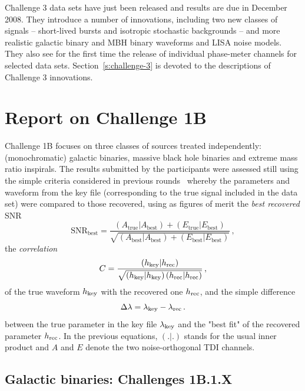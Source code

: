 \documentclass{iopart}
\begin{document}
Challenge 3 data sets have just been released and results are due in December 2008. They introduce a number of innovations, including two new classes of signals -- short-lived bursts and isotropic stochastic backgrounds -- and more realistic galactic binary and MBH binary waveforms and LISA noise models. They also see for the first time the release of individual phase-meter channels for selected data sets. Section~\ref{s:challenge-3} is devoted to the descriptions of Challenge 3 innovations.


\section{Report on Challenge 1B}
\label{s:challenge-1b}

Challenge 1B focuses on three classes of sources treated independently: (monochromatic) galactic binaries, massive black hole binaries and extreme mass ratio inspirals. The results submitted by the participants were assessed still using the simple criteria considered in previous rounds~\cite{mldcgwdaw1, mldcamaldi2} whereby the parameters and waveform from the key file (corresponding to the true signal included in the data set) were compared to those recovered, using as figures of merit the {\em best recovered} SNR
%
\begin{equation}
\mathrm{SNR}_\mathrm{best}  = \frac{(A_\mathrm{true}|A_\mathrm{best}) + (E_\mathrm{true}|E_\mathrm{best})}
{\sqrt{(A_\mathrm{best}|A_\mathrm{best}) + (E_\mathrm{best}|E_\mathrm{best})}}\,,
\label{e:SNR}
\end{equation}
%
the {\em correlation}  
%
\begin{equation}
\label{cor}
C = \frac{\left(h_{\rm key}|h_{\rm rec}\right)}{\sqrt{\left(h_{\rm key}|h_{\rm key}\right)\left(h_{\rm rec}|h_{\rm rec}\right)}}\,,
\label{e:C}
\end{equation}
%
of the true waveform $h_{\rm key}$ with the recovered one $h_{\rm rec}$, and the simple difference 
%
\begin{equation}
\Delta\lambda = \lambda_{\rm key} - \lambda_{\rm rec}\,.
\label{e:deltalambda}
\end{equation}
%
between the true parameter in the key file $\lambda_{\rm key}$ and the "best fit" of the recovered parameter $h_{\rm rec}$. In the previous equations, $(.|.)$ stands for the usual inner product and $A$ and $E$ denote the two noise-orthogonal TDI channels.

\subsection{Galactic binaries: Challenges 1B.1.X}
\end{document}
